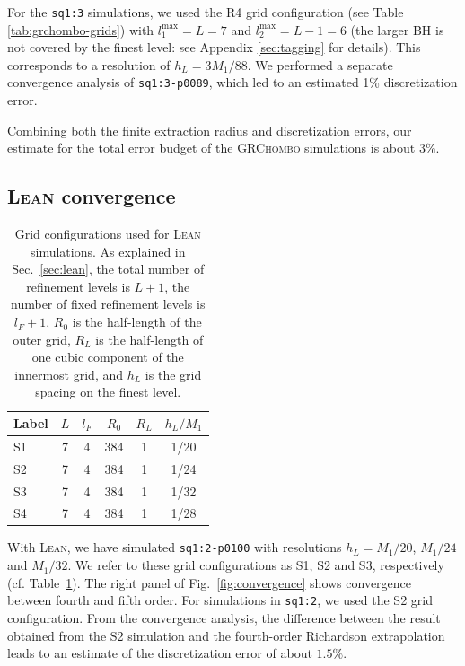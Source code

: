 \documentclass[floats,floatfix,showpacs,amssymb,physrev,twocolumn,superscriptaddress,reprint,
nofootinbib, longbibliography]{revtex4-2}
\begin{document}
For the \texttt{sq1:3} simulations, we used the R4 grid configuration
(see Table \ref{tab:grchombo-grids}) with $l_1^{\max}=L=7$ and
$l_2^{\max}=L-1=6$ (the larger BH is not covered by the finest level:
see Appendix \ref{sec:tagging} for details). This corresponds to a
resolution of $h_L=3M_1/88$. We performed a separate convergence
analysis of \texttt{sq1:3-p0089}, which led to an estimated 1\%
discretization error.

Combining both the finite extraction radius and discretization errors, 
our estimate for the total error budget of the \textsc{GRChombo} 
simulations is about $3\%$.


\subsection{\textsc{Lean} convergence}
\begin{table}[b]
    {
    \caption{Grid configurations used for \textsc{Lean} simulations. As 
    explained in Sec.~\ref{sec:lean}, the total number of refinement 
    levels is $L+1$, the number of fixed refinement levels is $l_F+1$, 
    $R_0$ is the half-length of the outer grid, $R_L$ is the half-length 
    of one cubic component of the innermost grid, and $h_L$ is the grid 
    spacing on the finest level.}
    \centering
    \begin{ruledtabular}
    \begin{tabular}{lccccc}
        Label & $L$ & $l_F$ & $R_0$ & $R_L$ & $h_L/M_1$\\
        \hline
        S1 & 7 & 4 & 384 & 1 & 1/20\\
        S2 & 7 & 4 & 384 & 1 & 1/24\\
        S3 & 7 & 4 & 384 & 1 & 1/32\\
        S4 & 7 & 4 & 384 & 1 & 1/28\\
    \end{tabular}
    \end{ruledtabular}
    }
    \label{tab:lean-grids}
\end{table}

With \textsc{Lean}, we have simulated \texttt{sq1:2-p0100} with
resolutions $h_L = M_1/20$, $M_1/24$ and $M_1/32$. We refer to these
grid configurations as S1, S2 and S3, respectively
(cf. Table~\ref{tab:lean-grids}). The right panel of Fig.~\ref{fig:convergence}
shows convergence between fourth and fifth order. For simulations in
\texttt{sq1:2}, we used the S2 grid configuration. From the
convergence analysis, the difference between the result obtained from
the S2 simulation and the fourth-order Richardson extrapolation leads
to an estimate of the discretization error of about $1.5\%$.
\end{document}
